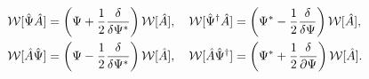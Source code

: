 \begin{theorem}
\label{thm:formalism:func-wigner:correspondences}
\begin{equation*}
\begin{split}
	\mathcal{W} [ \hat{\Psi} \hat{A} ]
		& = \left( \Psi + \frac{1}{2} \frac{\delta}{\delta \Psi^*} \right) \mathcal{W}[\hat{A}],
	\quad
	\mathcal{W} [ \hat{\Psi}^\dagger \hat{A} ]
		= \left( \Psi^* - \frac{1}{2} \frac{\delta}{\delta \Psi} \right) \mathcal{W}[\hat{A}], \\
	\mathcal{W} [ \hat{A} \hat{\Psi} ]
		& = \left( \Psi - \frac{1}{2} \frac{\delta}{\delta \Psi^*} \right) \mathcal{W}[\hat{A}],
	\quad
	\mathcal{W} [ \hat{A} \hat{\Psi}^\dagger ]
		= \left( \Psi^* + \frac{1}{2} \frac{\delta}{\partial \Psi} \right) \mathcal{W}[\hat{A}].
\end{split}
\end{equation*}
\end{theorem}
